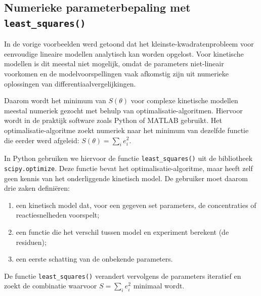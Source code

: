 \documentclass{ximera}
\begin{document}
\subsection*{Numerieke parameterbepaling met \texttt{least\_squares()}}

In de vorige voorbeelden werd getoond dat het kleinste-kwadratenprobleem voor eenvoudige lineaire modellen analytisch kan worden opgelost. Voor kinetische modellen is dit meestal niet mogelijk, omdat de parameters niet-lineair voorkomen en de modelvoorspellingen vaak afkomstig zijn uit numerieke oplossingen van differentiaalvergelijkingen.

Daarom wordt het minimum van $S(\theta)$ voor complexe kinetische modellen
meestal numeriek gezocht met behulp van optimalisatie-algoritmen. Hiervoor wordt in de praktijk software zoals Python of MATLAB gebruikt. Het optimalisatie-algoritme zoekt numeriek naar het minimum van dezelfde
functie die eerder werd afgeleid: $S(\theta)=\sum_i e_i^2$.

In Python gebruiken we hiervoor de functie
\texttt{least\_squares()} uit de bibliotheek
\texttt{scipy.optimize}.
Deze functie bevat het optimalisatie-algoritme, maar heeft zelf geen kennis van het onderliggende kinetisch model. De gebruiker moet daarom drie zaken definiëren:

\begin{enumerate}
    \item een kinetisch model dat, voor een gegeven set parameters, de concentraties of reactiesnelheden voorspelt;
    \item een functie die het verschil tussen model en experiment berekent
    (de residuen);
    \item een eerste schatting van de onbekende parameters.
\end{enumerate}

De functie \texttt{least\_squares()} verandert vervolgens de parameters
iteratief en zoekt de combinatie waarvoor $S=\sum_i e_i^2$ minimaal wordt.
\end{document}
